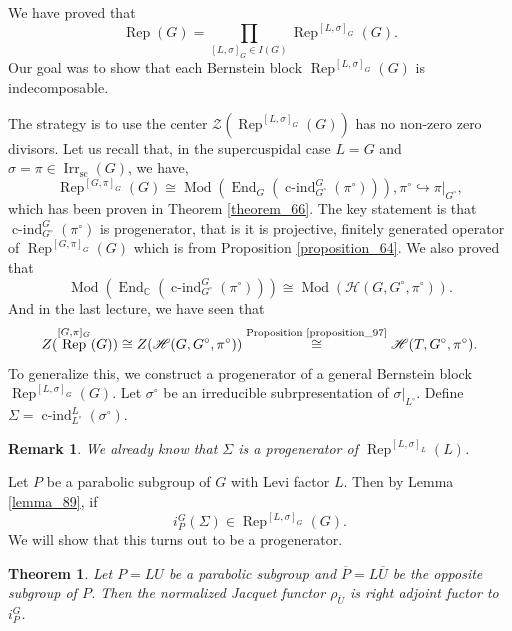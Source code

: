 \documentclass[8pt]{article}
\newtheorem{theorem}{Theorem} [section]
\newtheorem{remark}{Remark}[section]
\DeclareMathOperator{\cind}{c-ind}
\DeclareMathOperator{\Rep}{Rep}
\DeclareMathOperator{\End}{End}
\DeclareMathOperator{\Mod}{Mod}
\DeclareMathOperator{\supcus}{sc}
\DeclareMathOperator{\Irr}{Irr}
\newcommand{\C}[0]{\mathbb{C}}
\newcommand{\hecke}[0]{\mathscr{H}}
\begin{document}
  We have proved that 
  \begin{equation*}
    \Rep(G) = \prod_{[L,\sigma]_G\in I(G)}\Rep^{[L,\sigma]_G}(G).
  \end{equation*}
  Our goal was to show that each Bernstein block $\Rep^{[L,\sigma]_G}(G)$ is indecomposable.
  \par The strategy is to use the center $\mathscr{Z}(\Rep^{[L,\sigma]_G}(G))$ has no non-zero zero divisors. Let us recall that, in the supercuspidal case $L=G$ and $\sigma=\pi\in\Irr_{\supcus}(G)$, we have,
  \begin{equation*}
    \Rep^{[G,\pi]_G}(G)\cong \Mod(\End_G(\cind^G_{G^\circ}(\pi^\circ))), \pi^\circ\hookrightarrow \pi|_{G^\circ},
  \end{equation*}
  which has been proven in Theorem \ref{theorem_66}. The key statement is that $\cind_{G^\circ}^G(\pi^\circ)$ is progenerator, that is it is projective, finitely generated operator of $\Rep^{[G,\pi]_G}(G)$ which is from Proposition \ref{proposition_64}. We also proved that 
  \begin{equation*}
    \Mod(\End_\C(\cind_{G^\circ}^G(\pi^\circ))) \cong \Mod(\hecke(G,G^\circ,\pi^\circ)).
  \end{equation*}
  And in the last lecture, we have seen that 
  \begin{equation*}
    Z(\Rep^{[G,\pi]_G}(G))\cong Z(\hecke(G,G^\circ,\pi^\circ))\stackrel{\text{Proposition \ref{proposition_97}}}{\cong} \hecke(T,G^\circ,\pi^\circ).
  \end{equation*}
  To generalize this, we construct a progenerator of a general Bernstein block $\Rep^{[L,\sigma]_G}(G)$. Let $\sigma^\circ$ be an irreducible subrpresentation of $\sigma|_{L^\circ}$. Define $\Sigma = \cind_{L^\circ}^L(\sigma^\circ)$.
  \begin{remark}
    We already know that $\Sigma$ is a progenerator of $\Rep^{[L,\sigma]_L}(L)$.
  \end{remark}
  Let $P$ be a parabolic subgroup of $G$ with Levi factor $L$. Then by Lemma \ref{lemma_89}, if
  \begin{equation*}
    i_P^G(\Sigma)\in\Rep^{[L,\sigma]_G}(G).
  \end{equation*}
  We will show that this turns out to be a progenerator.
  \begin{theorem}
    \label{theorem_second_adjunction}
    Let $P=LU$ be a parabolic subgroup and $\overline{P}=L\overline{U}$ be the opposite subgroup of $P$. Then the normalized Jacquet functor $\rho_{\overline{U}}$ is right adjoint fuctor to $i_P^G$.
  \end{theorem}
\end{document}
